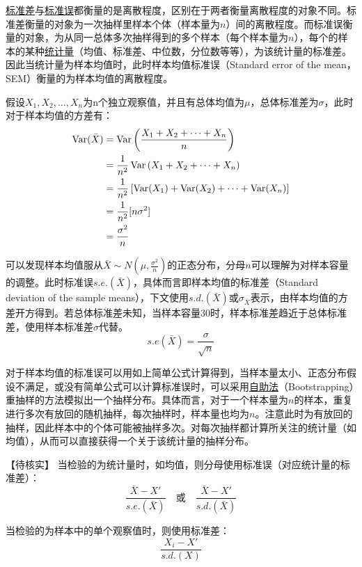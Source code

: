 \documentclass[11pt]{article}
\begin{document}
\uline{标准差}与\uline{标准误}都衡量的是离散程度，区别在于两者衡量离散程度的对象不同。标准差衡量的对象为一次抽样里样本个体（样本量为$n$）间的离散程度。而标准误衡量的对象，为从同一总体多次抽样得到的多个样本（每个样本量为$n$），每个的样本的某种\uline{统计量}（均值、标准差、中位数，分位数等等），为该统计量的标准差。因此当统计量为样本均值时，此时样本均值标准误（Standard error of the mean，SEM）衡量的为样本均值的离散程度。

假设$X_1,X_2,\dots,X_n$为n个独立观察值，并且有总体均值为$\mu$，总体标准差为$\sigma$，此时对于样本均值的方差有：
\begin{align*}
    \operatorname{Var}(\bar{X}) &= \operatorname{Var}\left(\frac{X_1 + X_2 + \dots + X_n}{n}\right) \\
    &= \frac{1}{n^2} \operatorname{Var}\left(X_1 + X_2 + \dots + X_n\right) \\
    &= \frac{1}{n^2} \left[ \operatorname{Var}(X_1) + \operatorname{Var}(X_2) + \dots + \operatorname{Var}(X_n) \right] \\
    &= \frac{1}{n^2} [n\sigma^2] \\
    &= \frac{\sigma^2}{n}
\end{align*}

可以发现样本均值服从$\bar{X}\sim N(\mu,\frac{\sigma^2}{n})$的正态分布，分母$n$可以理解为对样本容量的调整。此时标准误$s.e.(\bar{X})$，具体而言即样本均值的标准差（Standard deviation of the sample means），下文使用$s.d.(\bar{X})$或$\sigma_{\bar{X}}$表示，由样本均值的方差开方得到。若总体标准差未知，当样本容量30时，样本标准差趋近于总体标准差，使用样本标准差$\hat{\sigma}$代替。
\begin{equation*}
    s.e(\bar{X}) = \frac{\sigma}{\sqrt{n}}
\end{equation*}

对于样本均值的标准误可以用如上简单公式计算得到，当样本量太小、正态分布假设不满足，或没有简单公式可以计算标准误时，可以采用\uline{自助法}（Bootstrapping）重抽样的方法模拟出一个抽样分布。具体而言，对于一个样本量为$n$的样本，重复进行多次有放回的随机抽样，每次抽样时，样本量也均为$n$。注意此时为有放回的抽样，因此样本中的个体可能被抽样多次。对每次抽样都计算所关注的统计量（如均值），从而可以直接获得一个关于该统计量的抽样分布。

【待核实】
当检验的为统计量时，如均值，则分母使用标准误（对应统计量的标准差）：
\begin{equation*}
    \frac{\bar{X} - X'}{s.e.(\bar{X})} \quad\text{或}\quad \frac{\bar{X} - X'}{s.d.(\bar{X})}
\end{equation*}

当检验的为样本中的单个观察值时，则使用标准差：
\begin{equation*}
    \frac{X_i - X'}{s.d.(X)}
\end{equation*}
\end{document}
